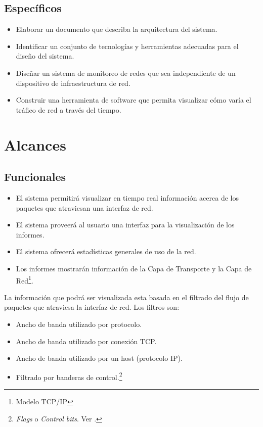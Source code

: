 \subsection*{Específicos}
\begin{itemize}
\item Elaborar un documento que describa la arquitectura del sistema.
\item Identificar un conjunto de tecnologías y herramientas adecuadas para el diseño del sistema.
\item Diseñar un sistema de monitoreo de redes que sea independiente de un dispositivo de infraestructura de red.
\item Construir una herramienta de software que permita visualizar cómo varía el tráfico de red a través del tiempo.

\end{itemize}

\section*{Alcances}

\subsection*{Funcionales}
\begin{itemize}
	\item El sistema permitirá visualizar en tiempo real información acerca de los paquetes que atraviesan una interfaz de red. 
	\item El sistema proveerá al usuario una interfaz para la visualización de los informes.
	\item El sistema ofrecerá estadísticas generales de uso de la red.
	\item Los informes mostrarán información de la Capa de Transporte y la Capa de Red\footnote{Modelo TCP/IP}.\cite{rfc791}\cite{rfc793}\cite{rfc1180}
\end{itemize}

La información que podrá ser visualizada esta basada en el filtrado del flujo de paquetes que atraviesa la interfaz de red. Los filtros son:
\begin{itemize}
\setlength{\itemsep}{0pt}
	\item Ancho de banda utilizado por protocolo.
	\item Ancho de banda utilizado por conexión TCP\cite{rfc793}.
	\item Ancho de banda utilizado por un host  (protocolo IP\cite{rfc1180}).
	\item Filtrado por banderas de control.\footnote{\textit{Flags} o \textit{Control bits}. Ver \cite{rfc793}.}
\end{itemize} 

